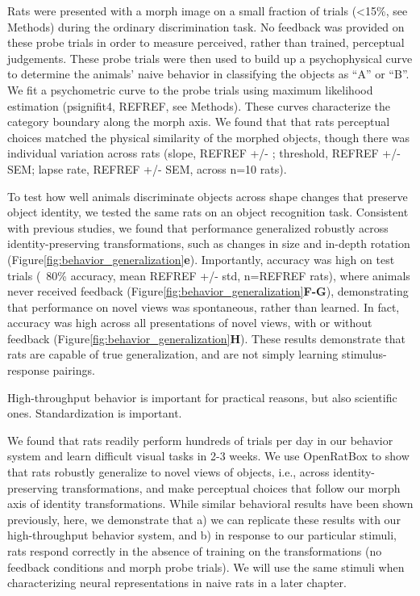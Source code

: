 Rats were presented with a morph image on a small fraction of trials (<15\%, see Methods) during the ordinary discrimination task. No feedback was provided on these probe trials in order to measure perceived, rather than trained, perceptual judgements. These probe trials were then used to build up a psychophysical curve to determine the animals' naive behavior in classifying the objects as ``A'' or ``B''. We fit a psychometric curve to the probe trials using maximum likelihood estimation (psignifit4, REFREF, see Methods). These curves characterize the category boundary along the morph axis. We found that that rats perceptual choices matched the physical similarity of the morphed objects, though there was individual variation across rats (slope, REFREF +/- ; threshold, REFREF +/- SEM; lapse rate, REFREF +/- SEM, across n=10 rats). 

To test how well animals discriminate objects across shape changes that preserve object identity, we tested the same rats on an object recognition task. Consistent with previous studies\cite{Zoccolan2009, Tafazoli2012Transformation-TolerantPriming, REFREF}, we found that performance generalized robustly across identity-preserving transformations, such as changes in size and in-depth rotation (Figure\ref{fig:behavior_generalization}\textbf{e}). Importantly, accuracy was high on test trials (~80\% accuracy, mean REFREF +/- std, n=REFREF rats), where animals never received feedback (Figure\ref{fig:behavior_generalization}\textbf{F-G}), demonstrating that performance on novel views was spontaneous, rather than learned. In fact, accuracy was high across all presentations of novel views, with or without feedback (Figure\ref{fig:behavior_generalization}\textbf{H}). These results demonstrate that rats are capable of true generalization, and are not simply learning stimulus-response pairings. 

High-throughput behavior is important for practical reasons, but also scientific ones. 
Standardization is important. 

We found that rats readily perform hundreds of trials per day in our behavior system and learn difficult visual tasks in 2-3 weeks. We use OpenRatBox to show that rats robustly generalize to novel views of objects, i.e., across identity-preserving transformations, and make perceptual choices that follow our morph axis of identity transformations. While similar behavioral results have been shown previously\cite{Zoccolan2009, Tafazoli2012Transformation-TolerantPriming, Vermaercke2012}, here, we demonstrate that a) we can replicate these results with our high-throughput behavior system, and b) in response to our particular stimuli, rats respond correctly in the absence of training on the transformations (no feedback conditions and morph probe trials). We will use the same stimuli when characterizing neural representations in naive rats in a later chapter. 

